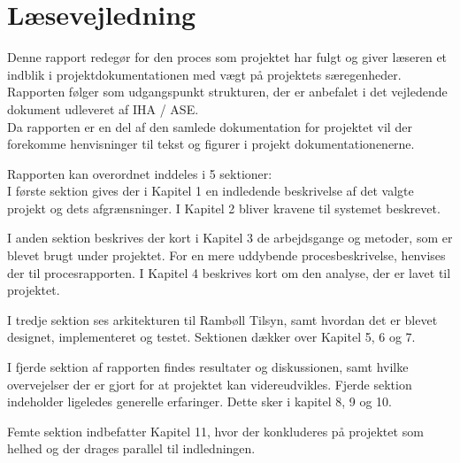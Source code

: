 \chapter*{Læsevejledning}
Denne rapport redegør for den proces som projektet har fulgt og giver læseren et indblik i projektdokumentationen med vægt på projektets særegenheder. Rapporten følger som udgangspunkt strukturen, der er anbefalet i det vejledende dokument udleveret af IHA / ASE.\\
Da rapporten er en del af den samlede dokumentation for projektet vil der forekomme
henvisninger til tekst og figurer i projekt dokumentationenerne.


Rapporten kan overordnet inddeles i 5 sektioner:\\
I første sektion gives der i Kapitel 1 en indledende beskrivelse af det valgte projekt og
dets afgrænsninger. I Kapitel 2 bliver kravene til systemet beskrevet.

I anden sektion beskrives der kort i Kapitel 3 de arbejdsgange og metoder, som er blevet brugt
under projektet. For en mere uddybende procesbeskrivelse, henvises der til procesrapporten.
I Kapitel 4 beskrives kort om den analyse, der er lavet til projektet.

I tredje sektion ses arkitekturen til Rambøll Tilsyn, samt hvordan det er blevet designet, implementeret og testet. 
Sektionen dækker over Kapitel 5, 6 og 7.

I fjerde sektion af rapporten findes resultater og diskussionen, samt hvilke overvejelser
der er gjort for at projektet kan videreudvikles. Fjerde sektion indeholder ligeledes generelle erfaringer. 
Dette sker i kapitel 8, 9 og 10.

Femte sektion indbefatter Kapitel 11, hvor der konkluderes på projektet som helhed og
der drages parallel til indledningen.

